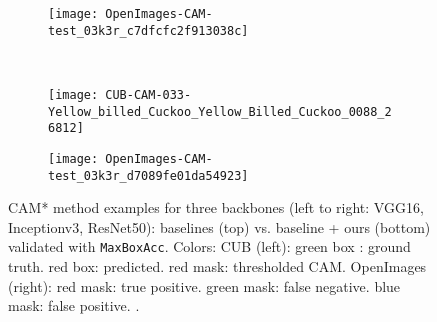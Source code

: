 \documentclass[twocolumn]{article}
\newcommand\maxboxacc{\texttt{MaxBoxAcc}\xspace}
\theoremstyle{definition}
\begin{document}
\begin{figure*}
     \hfill
     \begin{subfigure}[b]{0.49\textwidth}
         \centering
         \texttt{[image: OpenImages-CAM-test\_03k3r\_c7dfcfc2f913038c]}
     \end{subfigure}
     \\
     \vspace{0.1cm}
     \begin{subfigure}[b]{0.49\textwidth}
         \centering
         \texttt{[image: CUB-CAM-033-Yellow\_billed\_Cuckoo\_Yellow\_Billed\_Cuckoo\_0088\_26812]}
     \end{subfigure}
     \hfill
     \begin{subfigure}[b]{0.49\textwidth}
         \centering
         \texttt{[image: OpenImages-CAM-test\_03k3r\_d7089fe01da54923]}
     \end{subfigure}
        \caption{CAM* method examples for three backbones (left to right: VGG16, Inceptionv3, ResNet50): baselines (top) vs. baseline + ours (bottom)  validated with \maxboxacc. Colors: CUB (left): green box : ground truth. red box: predicted. red mask: thresholded CAM. OpenImages (right): red mask: true positive. green mask: false negative. blue mask: false positive. .}
        \label{fig:cam-cub-openim-example-pred}
\end{figure*}
\end{document}
